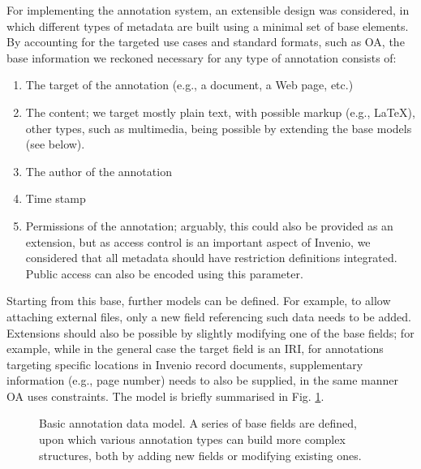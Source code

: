 
For implementing the annotation system, an extensible design was considered, in
which different types of metadata are built using a minimal set of base
elements.  By accounting for the targeted use cases and standard formats, such
as OA, the base information we reckoned necessary for any type of annotation
consists of:
\begin{enumerate}
  \item The target of the annotation (e.g., a document, a Web page, etc.)
  \item The content; we target mostly plain text, with possible markup
        (e.g., LaTeX), other types, such as multimedia, being possible by
        extending the base models (see below).
  \item The author of the annotation
  \item Time stamp
  \item Permissions of the annotation; arguably, this could also be provided as
        an extension, but as access control is an important aspect of Invenio,
        we considered that all metadata should have restriction definitions
        integrated. Public access can also be encoded using this parameter.
\end{enumerate}

Starting from this base, further models can be defined. For example, to allow
attaching external files, only a new field referencing such data needs to be
added. Extensions should also be possible by slightly modifying one of the base
fields; for example, while in the general case the target field is an IRI, for
annotations targeting specific locations in Invenio record documents,
supplementary information (e.g., page number) needs to also be supplied, in the
same manner OA uses constraints. The model is briefly summarised in Fig.
\ref{fig:datamodel}.

\begin{figure}[!ht]
  \centering
  \caption[Basic annotation data model]
          {Basic annotation data model. A series of base fields are defined,
           upon which various annotation types can build more complex
           structures, both by adding new fields or modifying existing ones.}
  \label{fig:datamodel}
\end{figure}

